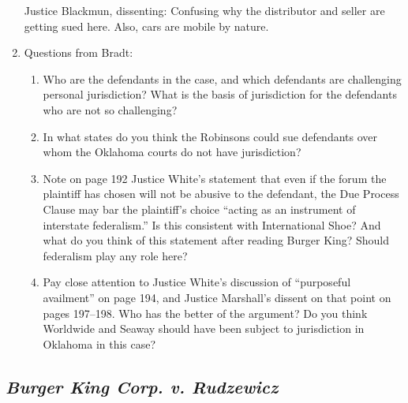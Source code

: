 \begin{enumerate}
    Justice Blackmun, dissenting: Confusing why the distributor and seller are getting sued here. Also, cars are mobile by nature.
    \item Questions from Bradt:
    \begin{enumerate}
        \item Who are the defendants in the case, and which defendants are challenging personal jurisdiction? What is the basis of jurisdiction for the defendants who are not so challenging?
        \item In what states do you think the Robinsons could sue defendants over whom the Oklahoma courts do not have jurisdiction?
        \item Note on page 192 Justice White's statement that even if the forum the plaintiff has chosen will not be abusive to the defendant, the Due Process Clause may bar the plaintiff's choice ``acting as an instrument of interstate federalism.''  Is this consistent with International Shoe?  And what do you think of this statement after reading Burger King?  Should federalism play any role here?
        \item Pay close attention to Justice White's discussion of ``purposeful availment'' on page 194, and Justice Marshall's dissent on that point on pages 197--198. Who has the better of the argument?  Do you think Worldwide and Seaway should have been subject to jurisdiction in Oklahoma in this case?
    \end{enumerate}

\end{enumerate}

\subsection{\emph{Burger King Corp. v. Rudzewicz}}

